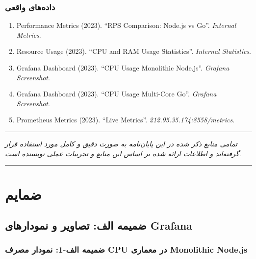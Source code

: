 \documentclass[
]{article}
\begin{document}
\subsubsection{داده‌های
واقعی}\label{ux62fux627ux62fux647ux647ux627ux6cc-ux648ux627ux642ux639ux6cc}

\begin{enumerate}
\def\labelenumi{\arabic{enumi}.}
\setcounter{enumi}{40}
\item
  Performance Metrics (2023). ``RPS Comparison: Node.js vs Go''.
  \emph{Internal Metrics}.
\item
  Resource Usage (2023). ``CPU and RAM Usage Statistics''.
  \emph{Internal Statistics}.
\item
  Grafana Dashboard (2023). ``CPU Usage Monolithic Node.js''.
  \emph{Grafana Screenshot}.
\item
  Grafana Dashboard (2023). ``CPU Usage Multi-Core Go''. \emph{Grafana
  Screenshot}.
\item
  Prometheus Metrics (2023). ``Live Metrics''.
  \emph{212.95.35.174:8558/metrics}.
\end{enumerate}

\begin{center}\rule{0.5\linewidth}{0.5pt}\end{center}

\emph{تمامی منابع ذکر شده در این پایان‌نامه به صورت دقیق و کامل مورد
استفاده قرار گرفته‌اند و اطلاعات ارائه شده بر اساس این منابع و تجربیات
عملی نویسنده است.}

\begin{center}\rule{0.5\linewidth}{0.5pt}\end{center}

\section{ضمایم}\label{ux636ux645ux627ux6ccux645}

\subsection{ضمیمه الف: تصاویر و نمودارهای
Grafana}\label{ux636ux645ux6ccux645ux647-ux627ux644ux641-ux62aux635ux627ux648ux6ccux631-ux648-ux646ux645ux648ux62fux627ux631ux647ux627ux6cc-grafana}

\subsubsection{ضمیمه الف-1: نمودار مصرف CPU در معماری Monolithic
Node.js}\label{ux636ux645ux6ccux645ux647-ux627ux644ux641-1-ux646ux645ux648ux62fux627ux631-ux645ux635ux631ux641-cpu-ux62fux631-ux645ux639ux645ux627ux631ux6cc-monolithic-node.js}
\end{document}
